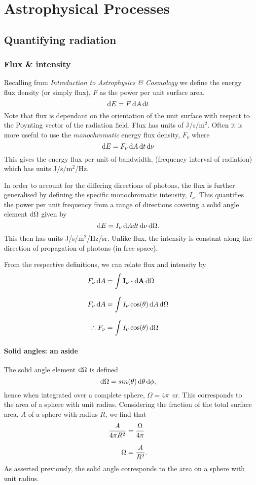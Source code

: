 \chapter{Astrophysical Processes}
\minitoc
\pagebreak
\section{Quantifying radiation}
\subsection{Flux \& intensity}
Recalling from \textit{Introduction to Astrophysics \& Cosmology} we define the energy flux density (or simply flux), $F$ as the power per unit surface area.
%
$$ \mathop{}\!\mathrm{d} E = F \mathop{}\!\mathrm{d} A \mathop{}\!\mathrm{d} t $$
%
Note that flux is dependant on the orientation of the unit surface with respect to the Poynting vector of the radiation field.
 Flux has units of J/s/m$^2$.
 Often it is more useful to use the \emph{monochromatic} energy flux density, $F_\nu$ where
%
\begin{equation}
	\mathop{}\!\mathrm{d} E = F_\nu \mathop{}\!\mathrm{d} A \mathop{}\!\mathrm{d} t \mathop{}\!\mathrm{d} \nu
	\label{eq:AP:def_flux}
\end{equation}
%
This gives the energy flux per unit of bandwidth, (frequency interval of radiation) which has units J/s/m$^2$/Hz.
\par 
In order to account for the differing directions of photons, the flux is further generalised by defining the specific monochromatic intensity, $I_\nu$.
 This quantifies the power per unit frequency from a range of directions covering a solid angle element $\mathop{}\!\mathrm{d} \Omega$ given by
%
\begin{equation}
	\mathop{}\!\mathrm{d} E = I_\nu \mathop{}\!\mathrm{d} A dt \mathop{}\!\mathrm{d} \nu \mathop{}\!\mathrm{d} \Omega.
	\label{eq:AP:def_intensity}
\end{equation}
%
This then has units J/s/m$^2$/Hz/sr.
 Unlike flux, the intensity is constant along the direction of propagation of photons (in free space).
\par
From the respective definitions, we can relate flux and intensity by
%
\begin{align*}
	F_\nu \diff A &= \int \mathbf{I_\nu} \dotp \mathbf{\diff A} \diff \Omega
	\linedrop
	F_\nu \diff A &= \int I_\nu \cos(\theta) \diff A \diff \Omega
	\linedrop
	\therefore F_\nu &= \int I_\nu \cos(\theta) \diff \Omega
\end{align*}
%

\subsubsection{Solid angles: an aside}
The solid angle element $\mathop{}\!\mathrm{d} \Omega$ is defined
%
$$ \mathop{}\!\mathrm{d} \Omega = sin(\theta) \mathop{}\!\mathrm{d} \theta \mathop{}\!\mathrm{d} \phi , $$
%
hence when integrated over a complete sphere, $\Omega = 4\pi$~sr.
 This corresponds to the area of a sphere with unit radius.
 Considering the fraction of the total surface area, $A$ of a sphere with radius $R$, we find that
%
\begin{align}
	\frac{A}{4\pi R^2} &= \frac{\Omega}{4\pi}
	\linedrop
	\Omega &= \frac{A}{R^2}.
	\label{eq:AP:solid_angle}
\end{align}
%
As asserted previously, the solid angle corresponds to the area on a sphere with unit radius.
%
